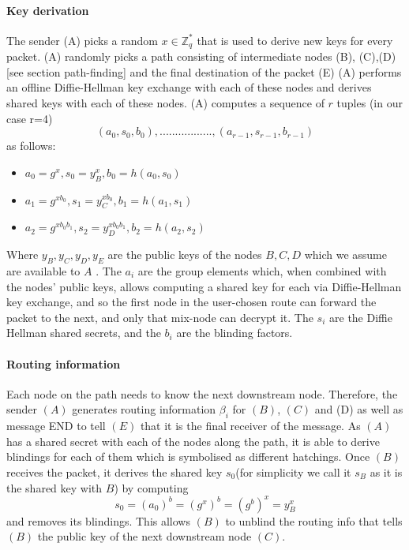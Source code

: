 \paragraph{Key derivation}
The sender (A) picks a random $x\in \mathbb{Z}^*_q$ that is used to derive new keys for every packet. 
\newline (A) randomly picks a path consisting of intermediate nodes (B), (C),(D) [see section path-finding] and the final destination of the packet (E) 
\newline (A) performs an offline Diffie-Hellman key exchange with each of these nodes and derives shared keys with each of these nodes.
\newline (A) computes a sequence of $r$ tuples (in our case r=4)  $$(a_0,s_0,b_0),.................,(a_{r-1},s_{r-1},b_{r-1})$$ as follows:
\begin{itemize}
\item $a_0=g^x,s_0=y^x_B,b_0=h(a_0,s_0)$
\item $a_1=g^{xb_0},s_1=y^{xb_0}_C,b_1=h(a_1,s_1)$
\item $a_2=g^{xb_0b_1},s_2=y^{xb_0b_1}_D,b_2=h(a_2,s_2)$
\end{itemize}
 Where $y_B,y_C,y_D,y_E$ are the public keys of the nodes $B,C, D$  which we assume are available to $A$ . The $a_i$ are the group elements which, when combined with the nodes’ public keys, allows computing a shared key for each via Diffie-Hellman key exchange, 
 and so the first node in the user-chosen route can forward the packet to the next, and only that mix-node can decrypt it.
The $s_i$ are the Diffie Hellman shared secrets, and the $b_i$ are the blinding factors.


\paragraph{Routing information}
Each node on the path needs to know the next downstream node. Therefore, the sender $(A)$ generates routing information $\beta_i$ for $(B)$, $(C)$ and (D) as well as message END to tell $(E)$ that it is the final receiver of the message. 
\newline As $(A)$ has a shared secret with each of the nodes along the path, it is able to derive blindings for each of them which is symbolised as different hatchings.
\newline Once $(B)$ receives the packet, it derives the shared key $s_0$(for simplicity we call it $s_B$ as it is the shared key with $B$) by computing
$$s_0=(a_0)^b=(g^x)^b=(g^b)^x=y^x_B$$ and removes its blindings. This allows $(B)$ to unblind the routing info that tells $(B)$ the public key of the next downstream node $(C)$.

